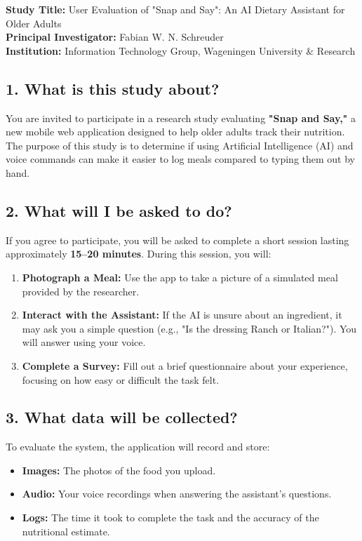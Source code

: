 \label{app:consent_form}

\textbf{Study Title:} User Evaluation of "Snap and Say": An AI Dietary Assistant for Older Adults \\
\textbf{Principal Investigator:} Fabian W. N. Schreuder \\
\textbf{Institution:} Information Technology Group, Wageningen University \& Research

\subsection*{1. What is this study about?}

You are invited to participate in a research study evaluating \textbf{"Snap and Say,"} a new mobile web application designed to help older adults track their nutrition. The purpose of this study is to determine if using Artificial Intelligence (AI) and voice commands can make it easier to log meals compared to typing them out by hand.

\subsection*{2. What will I be asked to do?}

If you agree to participate, you will be asked to complete a short session lasting approximately \textbf{15--20 minutes}. During this session, you will:

\begin{enumerate}
    \item \textbf{Photograph a Meal:} Use the app to take a picture of a simulated meal provided by the researcher.
    \item \textbf{Interact with the Assistant:} If the AI is unsure about an ingredient, it may ask you a simple question (e.g., "Is the dressing Ranch or Italian?"). You will answer using your voice.
    \item \textbf{Complete a Survey:} Fill out a brief questionnaire about your experience, focusing on how easy or difficult the task felt.
\end{enumerate}

\subsection*{3. What data will be collected?}

To evaluate the system, the application will record and store:

\begin{itemize}
    \item \textbf{Images:} The photos of the food you upload.
    \item \textbf{Audio:} Your voice recordings when answering the assistant's questions.
    \item \textbf{Logs:} The time it took to complete the task and the accuracy of the nutritional estimate.
\end{itemize}

